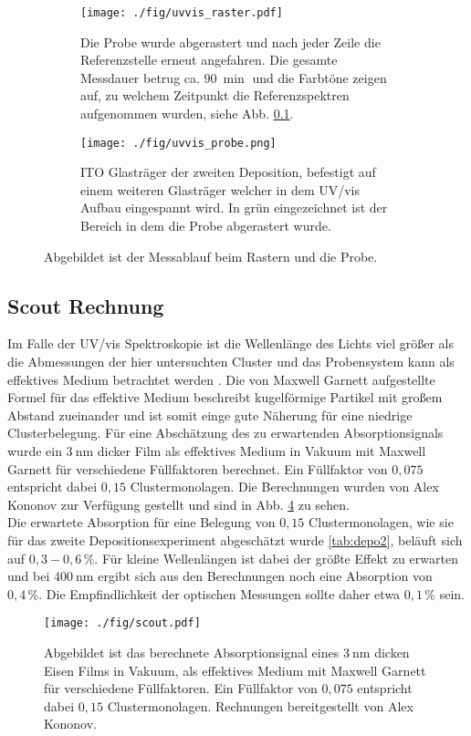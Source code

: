 \begin{figure}
    \begin{subfigure}[b]{0.65\textwidth}
      \texttt{[image: ./fig/uvvis\_raster.pdf]}
      \caption{Die Probe wurde abgerastert und nach jeder Zeile die Referenzstelle erneut angefahren. 
      Die gesamte Messdauer betrug ca. $\SI{90}{\min}$ und die Farbtöne zeigen auf, zu welchem Zeitpunkt die Referenzspektren aufgenommen wurden, siehe Abb. \ref{sec:scoutsim}.}
      \label{fig:uvvis_raster}
    \end{subfigure}\hfill
    \begin{subfigure}[b]{0.325\textwidth}
      \texttt{[image: ./fig/uvvis\_probe.png]}
      \caption{ITO Glasträger der zweiten Deposition, befestigt auf einem weiteren Glasträger welcher in dem UV/vis Aufbau eingespannt wird. In grün eingezeichnet ist der Bereich in dem die Probe abgerastert wurde.}
      \label{fig:uvvis_probe}
    \end{subfigure}
    \caption{Abgebildet ist der Messablauf beim Rastern und die Probe.} 
    \label{fig:uvvis_ablauf}
\end{figure}
\subsection{Scout Rechnung}
\label{sec:scoutsim}
Im Falle der UV/vis Spektroskopie ist die Wellenlänge des Lichts viel größer als die Abmessungen der hier untersuchten Cluster und das Probensystem kann als effektives Medium betrachtet werden \cite[S. 149 ff.]{Thei.1993}.
Die von Maxwell Garnett aufgestellte Formel für das effektive Medium beschreibt kugelförmige Partikel mit großem Abstand zueinander und ist somit einge gute Näherung für eine niedrige Clusterbelegung. 
Für eine Abschätzung des zu erwartenden Absorptionsignals wurde ein $\SI{3}{\nm}$ dicker Film als effektives Medium in Vakuum mit Maxwell Garnett für verschiedene Füllfaktoren berechnet.
Ein Füllfaktor von $0,075$ entspricht dabei $0,15$ Clustermonolagen.
Die Berechnungen wurden von Alex Kononov zur Verfügung gestellt und sind in Abb. \ref{fig:scout} zu sehen.\\

Die erwartete Absorption für eine Belegung von $0,15$ Clustermonolagen, wie sie für das zweite Depositionsexperiment abgeschätzt wurde \ref{tab:depo2}, beläuft sich auf $0,3 - 0,6\,\%$.
Für kleine Wellenlängen ist dabei der größte Effekt zu erwarten und bei $\SI{400}{\nm}$ ergibt sich aus den Berechnungen noch eine Absorption von $0,4\,\%$. Die Empfindlichkeit der optischen Messungen sollte daher etwa $0,1\,\%$ sein.
\begin{figure}[h]
  \centering
  \texttt{[image: ./fig/scout.pdf]}
  \caption{Abgebildet ist das berechnete Absorptionsignal eines $\SI{3}{\nm}$ dicken Eisen Films in Vakuum, als effektives Medium mit Maxwell Garnett für verschiedene Füllfaktoren. Ein Füllfaktor von $0,075$ entspricht dabei $0,15$ Clustermonolagen. Rechnungen bereitgestellt von Alex Kononov.}
  \label{fig:scout}
\end{figure}

